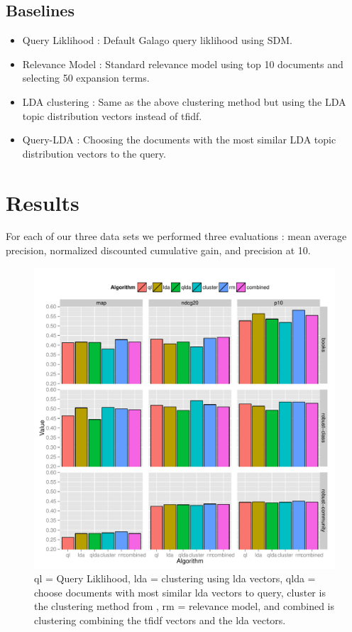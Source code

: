 \documentclass[paper=a4, fontsize=11pt]{scrartcl} %
\numberwithin{equation}{section} %
\numberwithin{figure}{section} %
\numberwithin{table}{section} %
\begin{document}
\subsection{Baselines}
\begin {itemize}
\item Query Liklihood : Default Galago query liklihood using SDM.
\item Relevance Model : Standard relevance model using top 10 documents and selecting 50 expansion terms.
\item LDA clustering : Same as the above clustering method but using the LDA topic distribution vectors instead of tfidf.
\item Query-LDA : Choosing the documents with the most similar LDA topic distribution vectors to the query.
\end {itemize} 


\section {Results}

For each of our three data sets we performed three evaluations : mean average precision, normalized discounted cumulative gain, and precision at 10.

\begin{figure}[H] 
\centerline{\includegraphics[width=1\textwidth]{results}}
  \caption{ql = Query Liklihood, lda = clustering using lda vectors, qlda = choose documents with most similar lda vectors to query, cluster is the clustering method from \cite{Lee2008}, rm = relevance model, and combined is clustering combining the tfidf vectors and the lda vectors.}
  \label{fig:zipf}
 \end{figure}
\end{document}
